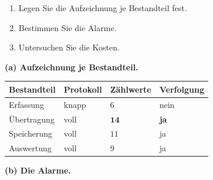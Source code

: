 \begin{aufgabe}
\begin{enumerate}[label=(\alph*)]
\item Legen Sie die Aufzeichnung je Bestandteil fest.
\item Bestimmen Sie die Alarme.
\item Untersuchen Sie die Kosten.
\end{enumerate}

\loesung
\textbf{(a) Aufzeichnung je Bestandteil.}

\begin{center}
{\small
\renewcommand{\arraystretch}{1.45}
\begin{tabular}{@{}P{2.4cm}P{2.0cm}P{2.0cm}P{2.2cm}@{}}
\toprule
\textbf{Bestandteil} & \textbf{Protokoll} & \textbf{Zählwerte} & \textbf{Verfolgung}\\
\midrule
Erfassung & \textcolor{mittel}{knapp} & \textcolor{gruen}{$6$} & \textcolor{akzent}{nein}\\
Übertragung & \textcolor{gruen}{voll} & \textcolor{gruen}{$\mathbf{14}$} & \textcolor{gruen}{\textbf{ja}}\\
Speicherung & voll & $11$ & \textcolor{gruen}{ja}\\
Auswertung & voll & $9$ & \textcolor{gruen}{ja}\\
\bottomrule
\end{tabular}}
\end{center}

\begin{center}
\begin{minipage}{0.88\textwidth}
\end{minipage}
\end{center}

\begin{center}
\end{center}

\medskip
\textbf{(b) Die Alarme.}


\end{aufgabe}
